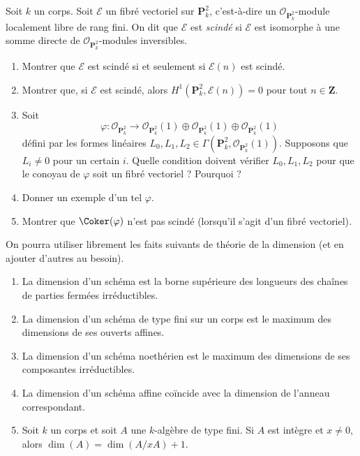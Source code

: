 \begin{exercise}
\label{exercise-nonsplit-vectorbundle}
Soit $k$ un corps.
Soit $\mathcal{E}$ un fibré vectoriel sur $\mathbf{P}^2_k$, c'est-à-dire un
$\mathcal{O}_{\mathbf{P}^2_k}$-module localement libre de rang fini.
On dit que $\mathcal{E}$ est {\it scindé} si $\mathcal{E}$ est isomorphe à
une somme directe de $\mathcal{O}_{\mathbf{P}^2_k}$-modules inversibles.
\begin{enumerate}
\item Montrer que $\mathcal{E}$ est scindé si et seulement si $\mathcal{E}(n)$
est scindé.
\item Montrer que, si $\mathcal{E}$ est scindé, alors
$H^1({\mathbf{P}^2_k}, \mathcal{E}(n)) = 0$
pour tout $n \in \mathbf{Z}$.
\item Soit
$$
\varphi :
\mathcal{O}_{\mathbf{P}^2_k}
\longrightarrow
\mathcal{O}_{\mathbf{P}^2_k}(1) \oplus
\mathcal{O}_{\mathbf{P}^2_k}(1) \oplus
\mathcal{O}_{\mathbf{P}^2_k}(1)
$$
défini par les formes linéaires
$L_0, L_1, L_2 \in \Gamma(\mathbf{P}^2_k, \mathcal{O}_{\mathbf{P}^2_k}(1))$.
Supposons que $L_i \not = 0$ pour un certain $i$.
Quelle condition doivent vérifier $L_0, L_1, L_2$ pour que
le conoyau de $\varphi$ soit un fibré vectoriel ?
Pourquoi ?
\item Donner un exemple d'un tel $\varphi$.
\item Montrer que $\Coker(\varphi)$ n'est pas scindé (lorsqu'il s'agit
d'un fibré vectoriel).
\end{enumerate}
\end{exercise}

\begin{remark}
\label{remark-recall-dimension-theory}
On pourra utiliser librement les faits suivants de théorie de la dimension
(et en ajouter d'autres au besoin).
\begin{enumerate}
\item La dimension d'un schéma est la borne supérieure des longueurs des chaînes
de parties fermées irréductibles.
\item La dimension d'un schéma de type fini sur un corps est le maximum
des dimensions de ses ouverts affines.
\item La dimension d'un schéma noethérien est le maximum des dimensions
de ses composantes irréductibles.
\item La dimension d'un schéma affine
coïncide avec la dimension de l'anneau correspondant.
\item Soit $k$ un corps et soit $A$ une $k$-algèbre de type fini.
Si $A$ est intègre et $x \not = 0$, alors $\dim(A) = \dim(A/xA) + 1$.
\end{enumerate}
\end{remark}


